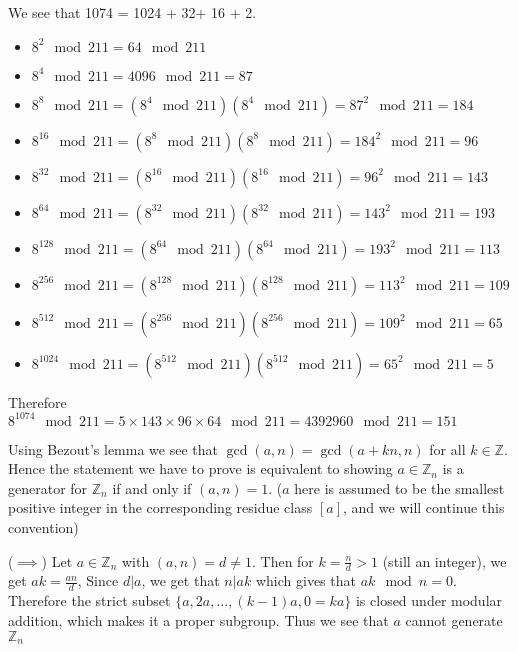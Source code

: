 \documentclass[12pt]{exam}
\theoremstyle{plain} %
\theoremstyle{definition} %
\theoremstyle{remark} %
\begin{document}
\begin{questions}
  \question
  \begin{solution}
    We see that 1074 = 1024 + 32+ 16 + 2. \begin{itemize}[]
      \item $8^2 \mod 211 = 64 \mod 211$
      \item $8^4 \mod 211 = 4096 \mod 211 = 87$
      \item $8^8 \mod 211 = (8^4 \mod 211)(8^4 \mod 211) = 87^2 \mod 211 = 184$
      \item $8^{16} \mod 211 = (8^8 \mod 211)(8^8 \mod 211) = 184^2 \mod 211 = 96$
      \item $8^{32} \mod 211 = (8^{16} \mod 211)(8^{16} \mod 211) = 96^2 \mod 211 = 143$
      \item $8^{64} \mod 211 = (8^{32} \mod 211)(8^{32} \mod 211) = 143^2 \mod 211 = 193$
      \item $8^{128} \mod 211 = (8^{64} \mod 211)(8^{64} \mod 211) = 193^2 \mod 211 = 113$
      \item $8^{256} \mod 211 = (8^{128} \mod 211)(8^{128} \mod 211) = 113^2 \mod 211 = 109$
      \item $8^{512} \mod 211 = (8^{256} \mod 211)(8^{256} \mod 211) = 109^2 \mod 211 = 65$
      \item $8^{1024} \mod 211 = (8^{512} \mod 211)(8^{512} \mod 211) = 65^2 \mod 211 = 5$
    \end{itemize}

    Therefore $8^{1074}\mod 211 = 5\times 143 \times 96 \times  64 \mod 211 = 4392960 \mod 211 = 151$
  \end{solution}

  \question
  \begin{solution}
    Using Bezout's lemma we see that $\gcd(a, n) = \gcd(a +kn , n)$ for all $k \in \mathbb{Z}$. Hence the statement we have to prove is equivalent to showing $a \in \mathbb{Z}_n$ is a generator for $\mathbb{Z}_n$ if and only if $(a, n) = 1$. ($a$ here is assumed to be the smallest positive integer in the corresponding residue class $[a]$, and we will continue this convention)

    ($\implies$)
    Let $a \in \mathbb{Z}_n$  with $(a, n) = d \neq 1$. Then for $k = \frac{n}{d} > 1$ (still an integer), we get $ak = \frac{an}{d}$, Since $d|a$, we get that $n|ak$ which gives that $ak \mod n = 0$. Therefore the strict subset $\{ a, 2a, \ldots, (k-1)a, 0=ka \}$ is closed under modular addition, which makes it a proper subgroup. Thus we see that $a$ cannot generate $\mathbb{Z}_n$


\end{solution}
\end{questions}
\end{document}
